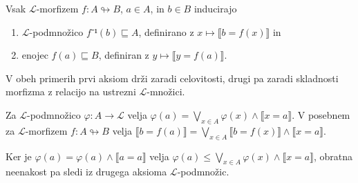 \begin{lema}\label{lem:image}
  Vsak \(ℒ\)-morfizem \(f : A ↬ B\), \(a ∈ A\), in \(b ∈ B\) inducirajo
  \begin{enumerate}
  \item \(ℒ\)-podmnožico \(f⁻¹(b) ⊑ A\), definirano z \(x ↦ ⟦b = f(x)⟧\) in
  \item enojec \(f(a) ⊑ B\), definiran z \(y ↦ ⟦y = f(a)⟧\).
  \end{enumerate}
\end{lema}
\begin{dokaz}
  V obeh primerih prvi aksiom drži zaradi celovitosti, drugi pa zaradi
  skladnosti morfizma z relacijo na ustrezni \(ℒ\)-množici.
\end{dokaz}

\begin{lema}\label{lem:subst}
  Za \(ℒ\)-podmnožico \(φ : A → ℒ\) velja \({φ(a) = ⋁_{x ∈ A} φ(x)∧⟦x = a⟧}\).
  V posebnem za \(ℒ\)-morfizem \(f : A ↬ B\) velja \(⟦b = f(a)⟧ = ⋁_{x ∈ A} ⟦b = f(x)⟧∧⟦x = a⟧\).
\end{lema}
\begin{dokaz}
  Ker je \({φ(a) = φ(a)∧⟦a = a⟧}\) velja \( φ(a) ≤ ⋁_{x ∈ A} φ(x)∧⟦x = a⟧\),
  obratna neenakost pa sledi iz drugega aksioma \(ℒ\)-podmnožic.
\end{dokaz}

